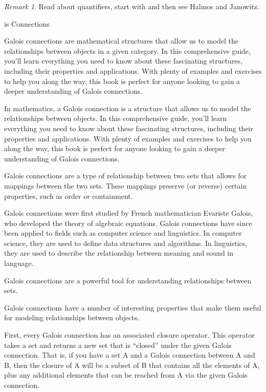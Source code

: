 \documentclass[
  letterpaper,
  10pt,
  reqno,
  twopage,
  openany]{book}
\theoremstyle{plain}
\theoremstyle{definition}
\theoremstyle{definition}
\theoremstyle{definition}
\theoremstyle{plain}
\theoremstyle{plain}
\theoremstyle{remark}
\newtheorem*{remark}{Remark}
\begin{document}
\begin{remark}
Read about quantifiers, start with \cite[p. 12]{MR2126425} and then see Halmos and Janowitz.
\end{remark}

is Connections

Galois connections are mathematical structures that allow us to model
the relationships between objects in a given category. In this
comprehensive guide, you'll learn everything you need to know about
these fascinating structures, including their properties and
applications. With plenty of examples and exercises to help you along
the way, this book is perfect for anyone looking to gain a deeper
understanding of Galois connections.

In mathematics, a Galois connection is a structure that allows us to
model the relationships between objects. In this comprehensive guide,
you'll learn everything you need to know about these fascinating
structures, including their properties and applications. With plenty of
examples and exercises to help you along the way, this book is perfect
for anyone looking to gain a deeper understanding of Galois connections.

Galois connections are a type of relationship between two sets that
allows for mappings between the two sets. These mappings preserve (or
reverse) certain properties, such as order or containment.

Galois connections were first studied by French mathematician Evariste
Galois, who developed the theory of algebraic equations. Galois
connections have since been applied to fields such as computer science
and linguistics. In computer science, they are used to define data
structures and algorithms. In linguistics, they are used to describe the
relationship between meaning and sound in language.

Galois connections are a powerful tool for understanding relationships
between sets.

Galois connections have a number of interesting properties that make
them useful for modeling relationships between objects.

First, every Galois connection has an associated closure operator. This
operator takes a set and returns a new set that is ``closed'' under the
given Galois connection. That is, if you have a set A and a Galois
connection between A and B, then the closure of A will be a subset of B
that contains all the elements of A, plus any additional elements that
can be reached from A via the given Galois connection.
\end{document}
